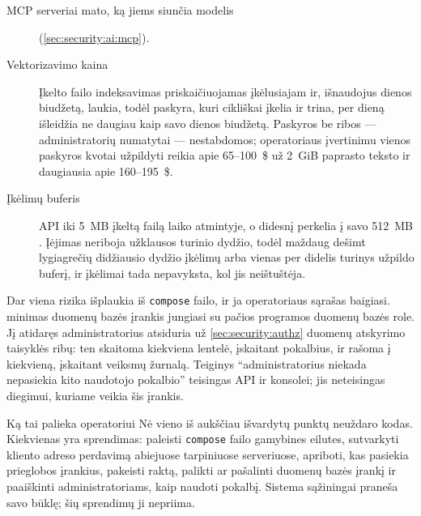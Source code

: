\begin{description}
  \item[MCP serveriai mato, ką jiems siunčia modelis] (\cref{sec:security:ai:mcp}).
  \item[Vektorizavimo kaina] Įkelto failo indeksavimas priskaičiuojamas įkėlusiajam ir,
    išnaudojus dienos biudžetą, laukia, todėl paskyra, kuri cikliškai įkelia ir trina, per
    dieną išleidžia ne daugiau kaip savo dienos biudžetą. Paskyros be ribos ---
    administratorių numatytai --- nestabdomos; operatoriaus įvertinimu vienos paskyros kvotai
    užpildyti reikia apie 65--100~\$ už 2~GiB paprasto teksto ir daugiausia apie
    160--195~\$.
  \item[Įkėlimų buferis] API iki 5~MB įkeltą failą laiko atmintyje, o didesnį perkelia į savo
    512~MB . Įėjimas neriboja užklausos turinio dydžio, todėl maždaug dešimt
    lygiagrečių didžiausio dydžio įkėlimų arba vienas per didelis turinys užpildo buferį, ir
    įkėlimai tada nepavyksta, kol jis neištuštėja.
\end{description}

Dar viena rizika išplaukia iš \texttt{compose} failo, ir ja operatoriaus sąrašas baigiasi.
 minimas duomenų bazės įrankis jungiasi su pačios programos
duomenų bazės role. Jį atidaręs administratorius atsiduria už \cref{sec:security:authz}
duomenų atskyrimo taisyklės ribų: ten skaitoma kiekviena lentelė, įskaitant pokalbius, ir
rašoma į kiekvieną, įskaitant veiksmų žurnalą. Teiginys \enquote{administratorius niekada
nepasiekia kito naudotojo pokalbio} teisingas API ir konsolei; jis neteisingas diegimui,
kuriame veikia šis įrankis.

\begin{humanbox}{Ką tai palieka operatoriui}
Nė vieno iš aukščiau išvardytų punktų neuždaro kodas. Kiekvienas yra sprendimas: paleisti
\texttt{compose} failo gamybines eilutes, sutvarkyti kliento adreso perdavimą abiejuose
tarpiniuose serveriuose, apriboti, kas pasiekia prieglobos įrankius, pakeisti
raktą, palikti ar pašalinti duomenų bazės įrankį ir paaiškinti administratoriams, kaip naudoti
pokalbį. Sistema sąžiningai praneša savo būklę; šių sprendimų ji nepriima.
\end{humanbox}
